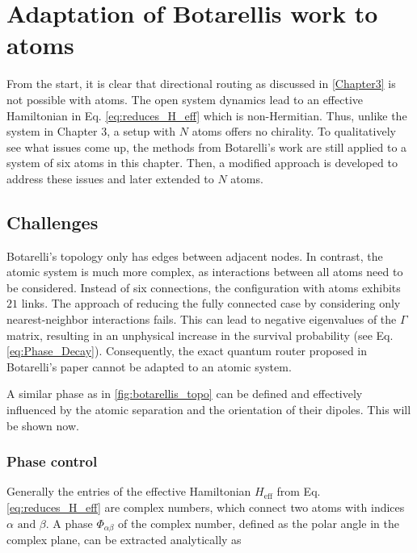\chapter{Adaptation of Botarellis work to atoms} \label{Chapter4}

\noindent
From the start, it is clear that directional routing as discussed in \autoref{Chapter3} is not possible with atoms.
The open system dynamics lead to an effective Hamiltonian in Eq. \eqref{eq:reduces_H_eff} which is non-Hermitian.
Thus, unlike the system in Chapter 3, a setup with $N$ atoms offers no chirality.
To qualitatively see what issues come up,
the methods from Botarelli's work are still applied to a system of six atoms in this chapter.
Then, a modified approach is developed to address these issues and later extended to $N$ atoms.


\section{Challenges} \label{sec:challenges}
Botarelli's topology only has edges between adjacent nodes.
In contrast, the atomic system is much more complex, as interactions between all atoms need to be considered.
Instead of six connections, the configuration with atoms exhibits $21$ links.
The approach of reducing the fully connected case by considering only nearest-neighbor interactions fails.
This can lead to negative eigenvalues of the $ \Gamma $ matrix,
resulting in an unphysical increase in the survival probability (see Eq. \eqref{eq:Phase_Decay}).
Consequently, the exact quantum router proposed in Botarelli's paper cannot be adapted to an atomic system.

\noindent
A similar phase as in \autoref{fig:botarellis_topo} can be defined and effectively influenced by the atomic separation and the orientation of their dipoles.
This will be shown now.

\subsection{Phase control} \label{subsec:Phase_control}
Generally the entries of the effective Hamiltonian $ H_{\text{eff}} $ from Eq. \eqref{eq:reduces_H_eff} are complex numbers,
which connect two atoms with indices $\alpha \text{ and } \beta$.
A phase $\Phi_{\alpha\beta}$ of the complex number,
defined as the polar angle in the complex plane,
can be extracted analytically as

